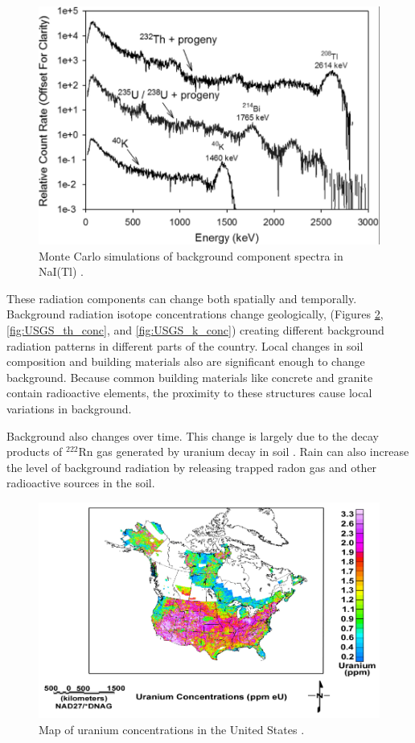 \begin{figure}[H]
\centering
\includegraphics[width=0.8\linewidth]{images/background_components}
\caption{Monte Carlo simulations of background component spectra in NaI(Tl) \cite{KULISEK2015}.}
\label{fig:background_components}
\end{figure}

These radiation components can change both spatially and temporally. Background radiation isotope concentrations change geologically, (Figures \ref{fig:USGS_u_conc}, \ref{fig:USGS_th_conc}, and \ref{fig:USGS_k_conc}) creating different background radiation patterns in different parts of the country. Local changes in soil composition and building materials also are significant enough to change background. Because common building materials like concrete and granite contain radioactive elements, the proximity to these structures cause local variations in background. 

Background also changes over time. This change is largely due to the decay products of $^{222}$Rn gas generated by uranium decay in soil \cite{knoll}. Rain can also increase the level of background radiation by releasing trapped radon gas and other radioactive sources in the soil.


\begin{figure}[H]
\centering
\includegraphics[width=0.9\linewidth]{images/USGS_u_conc}
\caption{Map of uranium concentrations in the United States \cite{USGS}.}
\label{fig:USGS_u_conc}
\end{figure}


